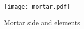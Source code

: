 \documentclass[a4paper,headsepline]{scrreprt}
\begin{document}
\begin{figure}[h!]
\centering
\texttt{[image: mortar.pdf]}
\caption{Mortar side and elements}
\label{labelname}
\end{figure}


%
%
\end{document}
